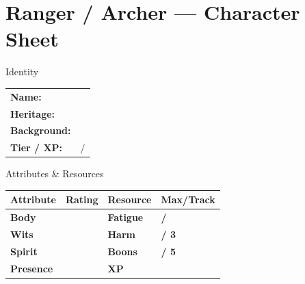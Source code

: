 \documentclass[10pt]{article}
\begin{document}
\newpage

\section*{Ranger / Archer --- Character Sheet}

\begin{minipage}[t]{0.48\linewidth}
    \begin{charbox}{Identity}
        \begin{tabular}{p{2.5cm} p{5cm}}
            \textbf{Name:} & \underline{\hspace{4cm}} \\
            \textbf{Heritage:} & \underline{\hspace{4cm}} \\
            \textbf{Background:} & \underline{\hspace{4cm}} \\
            \textbf{Tier / XP:} & \underline{\hspace{2cm}} / \underline{\hspace{2cm}} \\
        \end{tabular}
    \end{charbox}
    
    \vspace{0.5em}
    
    \begin{charbox}{Attributes \& Resources}
        \begin{tabular}{>{\bfseries}p{2.5cm} >{\bfseries}p{1.5cm} >{\bfseries}p{2.5cm} >{\bfseries}p{1.5cm}}
            \toprule
            \textbf{Attribute} & \textbf{Rating} & \textbf{Resource} & \textbf{Max/Track} \\
            \midrule
            Body & \underline{\hspace{1.5cm}} & Fatigue & \underline{\hspace{1.5cm}} / \underline{\hspace{1.5cm}} \\
            Wits & \underline{\hspace{1.5cm}} & Harm & \underline{\hspace{1.5cm}} / 3 \\
            Spirit & \underline{\hspace{1.5cm}} & Boons & \underline{\hspace{1.5cm}} / 5 \\
            Presence & \underline{\hspace{1.5cm}} & XP & \underline{\hspace{1.5cm}} \\
            \bottomrule
        \end{tabular}
    \end{charbox}
    

\end{minipage}
\end{document}
